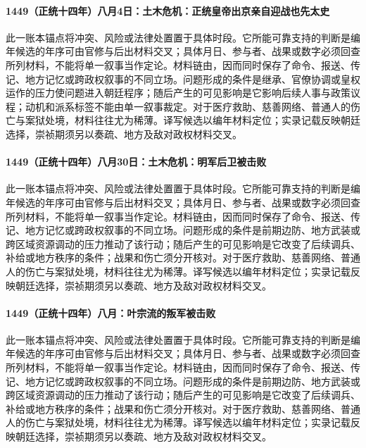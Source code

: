 \paragraph{1449（正统十四年）八月4日：土木危机：正统皇帝出京亲自迎战也先太史} 此一账本锚点将冲突、风险或法律处置置于具体时段。它所能可靠支持的判断是编年候选的年序可由官修与后出材料交叉；具体月日、参与者、战果或数字必须回查所列材料，不能将单一叙事当作定论。材料链由，因而同时保存了命令、报送、传记、地方记忆或跨政权叙事的不同立场。问题形成的条件是继承、官僚协调或皇权运作的压力使问题进入朝廷程序；随后产生的可见影响是它影响后续人事与政策议程；动机和派系标签不能由单一叙事裁定。对于医疗救助、慈善网络、普通人的伤亡与案狱处境，材料往往尤为稀薄。译写候选以编年材料定位；实录记载反映朝廷选择，崇祯期须另以奏疏、地方及敌对政权材料交叉。

\paragraph{1449（正统十四年）八月30日：土木危机：明军后卫被击败} 此一账本锚点将冲突、风险或法律处置置于具体时段。它所能可靠支持的判断是编年候选的年序可由官修与后出材料交叉；具体月日、参与者、战果或数字必须回查所列材料，不能将单一叙事当作定论。材料链由，因而同时保存了命令、报送、传记、地方记忆或跨政权叙事的不同立场。问题形成的条件是前期边防、地方武装或跨区域资源调动的压力推动了该行动；随后产生的可见影响是它改变了后续调兵、补给或地方秩序的条件；战果和伤亡须分开核对。对于医疗救助、慈善网络、普通人的伤亡与案狱处境，材料往往尤为稀薄。译写候选以编年材料定位；实录记载反映朝廷选择，崇祯期须另以奏疏、地方及敌对政权材料交叉。

\paragraph{1449（正统十四年）八月：叶宗流的叛军被击败} 此一账本锚点将冲突、风险或法律处置置于具体时段。它所能可靠支持的判断是编年候选的年序可由官修与后出材料交叉；具体月日、参与者、战果或数字必须回查所列材料，不能将单一叙事当作定论。材料链由，因而同时保存了命令、报送、传记、地方记忆或跨政权叙事的不同立场。问题形成的条件是前期边防、地方武装或跨区域资源调动的压力推动了该行动；随后产生的可见影响是它改变了后续调兵、补给或地方秩序的条件；战果和伤亡须分开核对。对于医疗救助、慈善网络、普通人的伤亡与案狱处境，材料往往尤为稀薄。译写候选以编年材料定位；实录记载反映朝廷选择，崇祯期须另以奏疏、地方及敌对政权材料交叉。

